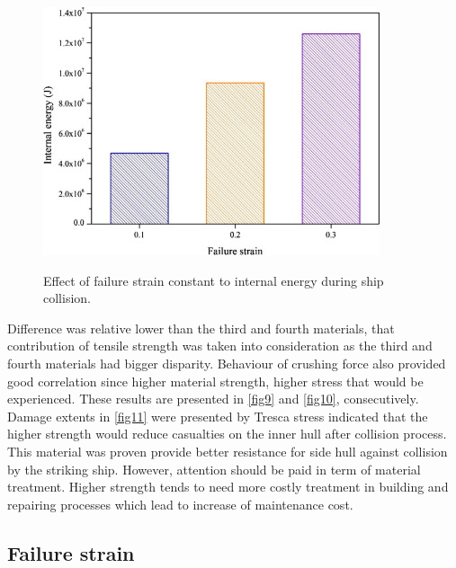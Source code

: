 \documentclass[../Final.tex]{subfiles}
\begin{document}
    
\begin{figure}[h]
    \centering
    \includegraphics[width=\columnwidth]{fig12.jpg}
    \label{fig12}
    \caption{Effect of failure strain constant to internal energy during ship collision.}
\end{figure}

Difference was relative lower than the third and fourth materials, that contribution of tensile strength was taken into consideration as the third and fourth materials had bigger disparity. 
Behaviour of crushing force also provided good correlation since higher material strength, higher stress that would be experienced. These results are presented in \ref{fig9} and \ref{fig10}, consecutively. 
Damage extents in \ref{fig11} were presented by Tresca stress indicated that the higher strength would reduce casualties on the inner hull after collision process. 
This material was proven provide better resistance for side hull against collision by the striking ship. However, attention should be paid in term of material treatment. 
Higher strength tends to need more costly treatment in building and repairing processes which lead to increase of maintenance cost. 

\subsection{Failure strain}
\end{document}
